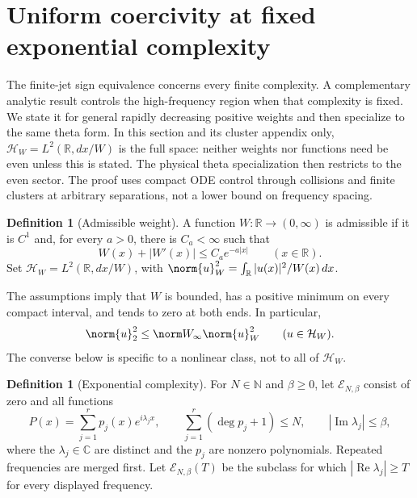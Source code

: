\documentclass[11pt,a4paper]{article}
\numberwithin{equation}{section}
\theoremstyle{definition}\newtheorem{definition}[theorem]{Definition}
\theoremstyle{remark}\newtheorem{remark}[theorem]{Remark}
\newcommand{\R}{\mathbb R}\newcommand{\C}{\mathbb C}\newcommand{\N}{\mathbb N}
\newcommand{\HH}{\mathcal H_W}\newcommand{\XX}{X_W}\newcommand{\EE}{\mathcal E_{N,\beta}}
\DeclareMathOperator{\Rea}{Re}\DeclareMathOperator{\Ima}{Im}
\begin{document}
\section{Uniform coercivity at fixed exponential complexity}\label{sec:complexity-unified}
The finite-jet sign equivalence concerns every finite complexity. A complementary analytic result controls the high-frequency region when that complexity is fixed. We state it for general rapidly decreasing positive weights and then specialize to the same theta form. In this section and its cluster appendix only, $\HH=L^2(\R,dx/W)$ is the full space: neither weights nor functions need be even unless this is stated. The physical theta specialization then restricts to the even sector. The proof uses compact ODE control through collisions and finite clusters at arbitrary separations, not a lower bound on frequency spacing.


\begin{definition}[Admissible weight]\label{e:def:weight}
A function $W:\R\to(0,\infty)$ is admissible if it is $C^1$ and, for every
$a>0$, there is $C_a<\infty$ such that
\begin{equation}\label{e:eq:weight}
 W(x)+|W'(x)|\le C_a e^{-a|x|}\qquad(x\in\R).
\end{equation}
Set $\HH=L^2(\R,dx/W)$, with
$\norm{u}_W^2=\int_\R |u(x)|^2/W(x)\,dx$.
\end{definition}

The assumptions imply that $W$ is bounded, has a positive minimum on every
compact interval, and tends to zero at both ends. In particular,
\begin{equation}\label{e:eq:embedding}
 \norm{u}_2^2\le \norm W_\infty\norm{u}_W^2\qquad(u\in\HH).
\end{equation}
The converse below is specific to a nonlinear class, not to all of $\HH$.

\begin{definition}[Exponential complexity]\label{e:def:complexity}
For $N\in\N$ and $\beta\ge0$, let $\EE$ consist of zero and all functions
\begin{equation}\label{e:eq:exp-poly}
 P(x)=\sum_{j=1}^r p_j(x)e^{i\lambda_jx},\qquad
 \sum_{j=1}^r(\deg p_j+1)\le N,\qquad |\Ima\lambda_j|\le\beta,
\end{equation}
where the $\lambda_j\in\C$ are distinct and the $p_j$ are nonzero
polynomials. Repeated frequencies are merged first. Let $\EE(T)$ be the
subclass for which $|\Rea\lambda_j|\ge T$ for every displayed frequency.
\end{definition}
\end{document}
